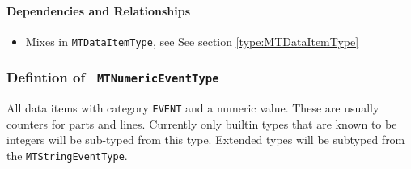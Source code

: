 \paragraph{Dependencies and Relationships}
\begin{itemize}
\item Mixes in \texttt{MTDataItemType}, see See section \ref{type:MTDataItemType}
\end{itemize}
\FloatBarrier
\subsubsection{Defintion of \texttt{ MTNumericEventType}}
  \label{type:MTNumericEventType}

\FloatBarrier

All data items with category \texttt{EVENT} and a numeric value. These are usually counters for 
parts and lines. Currently only builtin types that are known to be integers will be
sub-typed from this type. Extended types will be subtyped from the \texttt{MTStringEventType}.

